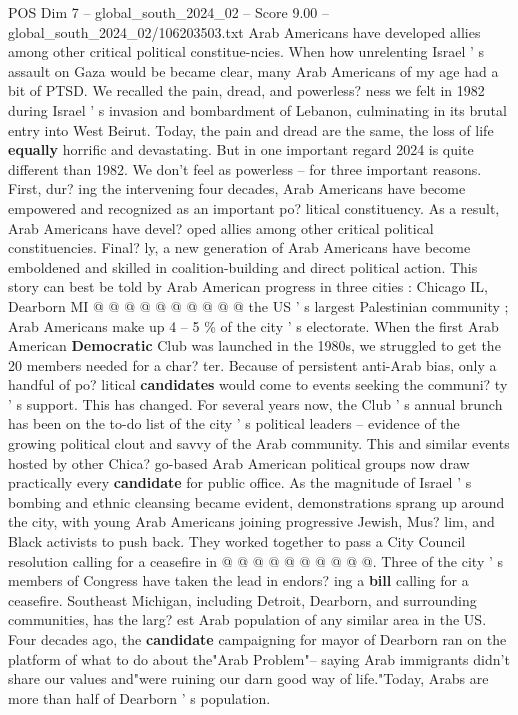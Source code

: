 \begin{textsample}{POS Dim 7 – global\_south\_2024\_02 – Score 9.00 – global\_south\_2024\_02/106203503.txt}  \label{ex:f7_pos_198}
Arab Americans have developed allies among other critical political constitue-ncies.
When how unrelenting Israel ' s assault on Gaza would be became clear, many Arab Americans of my age had a bit of PTSD.
We recalled the pain, dread, and powerless? ness we felt in 1982 during Israel ' s invasion and bombardment of Lebanon, culminating in its brutal entry into West Beirut.
Today, the pain and dread are the same, the loss of life \textbf{equally} horrific and devastating.
But in one important regard 2024 is quite different than 1982.
We don't feel as powerless -- for three important reasons.
First, dur? ing the intervening four decades, Arab Americans have become empowered and recognized as an important po? litical constituency.
As a result, Arab Americans have devel? oped allies among other critical political constituencies.
Final? ly, a new generation of Arab Americans have become emboldened and skilled in coalition-building and direct political action.
This story can best be told by Arab American progress in three cities : Chicago IL, Dearborn MI @ @ @ @ @ @ @ @ @ @ the US ' s largest Palestinian community ; Arab Americans make up 4 -- 5 \% of the city ' s electorate.
When the first Arab American \textbf{Democratic} Club was launched in the 1980s, we struggled to get the 20 members needed for a char? ter.
Because of persistent anti-Arab bias, only a handful of po? litical \textbf{candidates} would come to events seeking the communi? ty ' s support.
This has changed.
For several years now, the Club ' s annual brunch has been on the to-do list of the city ' s political leaders -- evidence of the growing political clout and savvy of the Arab community.
This and similar events hosted by other Chica? go-based Arab American political groups now draw practically every \textbf{candidate} for public office.
As the magnitude of Israel ' s bombing and ethnic cleansing became evident, demonstrations sprang up around the city, with young Arab Americans joining progressive Jewish, Mus? lim, and Black activists to push back.
They worked together to pass a City Council resolution calling for a ceasefire in @ @ @ @ @ @ @ @ @ @.
Three of the city ' s members of Congress have taken the lead in endors? ing a \textbf{bill} calling for a ceasefire.
Southeast Michigan, including Detroit, Dearborn, and surrounding communities, has the larg? est Arab population of any similar area in the US.
Four decades ago, the \textbf{candidate} campaigning for mayor of Dearborn ran on the platform of what to do about the"Arab Problem"-- saying Arab immigrants didn't share our values and"were ruining our darn good way of life."Today, Arabs are more than half of Dearborn ' s population.

\end{textsample}
